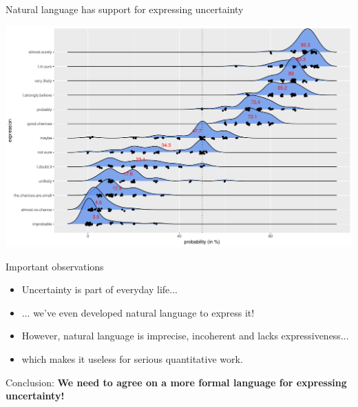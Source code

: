 \begin{frame}{Natural language has support for expressing uncertainty}
\begin{center}
\includegraphics[width=0.95\linewidth]{../LectureAssets/L01/questionnaire}
\end{center}
\end{frame}



\begin{frame}{Important observations}

\bigskip

\begin{itemize}\itemsep1.2em

\item Uncertainty is part of everyday life...

\item ... we've even developed natural language to express it!

\item However, natural language is imprecise, incoherent and lacks expressiveness...

\item which makes it useless for serious quantitative work.

\end{itemize}

\bigskip

Conclusion: \textbf{We need to agree on a more formal language for expressing uncertainty!}

\bigskip

\end{frame}



